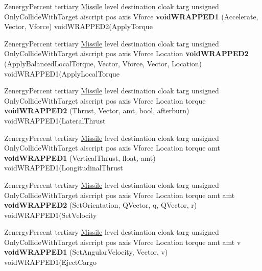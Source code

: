 \begin{DoxyCompactItemize}
\item 
Zenergy\+Percent tertiary \hyperlink{classMissile}{Missile} level destination cloak targ unsigned Only\+Collide\+With\+Target aiscript pos axis Vforce {\bfseries void\+W\+R\+A\+P\+P\+E\+D1} (Accelerate, Vector, Vforce) void\+W\+R\+A\+P\+P\+E\+D2(Apply\+Torque\hypertarget{classUnitWrapper_a747f10e478a4c68e806023e210dfbd9e}{}\label{classUnitWrapper_a747f10e478a4c68e806023e210dfbd9e}

\item 
Zenergy\+Percent tertiary \hyperlink{classMissile}{Missile} level destination cloak targ unsigned Only\+Collide\+With\+Target aiscript pos axis Vforce Location {\bfseries void\+W\+R\+A\+P\+P\+E\+D2} (Apply\+Balanced\+Local\+Torque, Vector, Vforce, Vector, Location) void\+W\+R\+A\+P\+P\+E\+D1(Apply\+Local\+Torque\hypertarget{classUnitWrapper_a66f83d8322c64e5e32cd712ec2e36564}{}\label{classUnitWrapper_a66f83d8322c64e5e32cd712ec2e36564}

\item 
Zenergy\+Percent tertiary \hyperlink{classMissile}{Missile} level destination cloak targ unsigned Only\+Collide\+With\+Target aiscript pos axis Vforce Location torque {\bfseries void\+W\+R\+A\+P\+P\+E\+D2} (Thrust, Vector, amt, bool, afterburn) void\+W\+R\+A\+P\+P\+E\+D1(Lateral\+Thrust\hypertarget{classUnitWrapper_a24edbdecf8bca27d250481aa52854764}{}\label{classUnitWrapper_a24edbdecf8bca27d250481aa52854764}

\item 
Zenergy\+Percent tertiary \hyperlink{classMissile}{Missile} level destination cloak targ unsigned Only\+Collide\+With\+Target aiscript pos axis Vforce Location torque amt {\bfseries void\+W\+R\+A\+P\+P\+E\+D1} (Vertical\+Thrust, float, amt) void\+W\+R\+A\+P\+P\+E\+D1(Longitudinal\+Thrust\hypertarget{classUnitWrapper_a58c887049cbddf2f1994d9a4bc4904cf}{}\label{classUnitWrapper_a58c887049cbddf2f1994d9a4bc4904cf}

\item 
Zenergy\+Percent tertiary \hyperlink{classMissile}{Missile} level destination cloak targ unsigned Only\+Collide\+With\+Target aiscript pos axis Vforce Location torque amt amt {\bfseries void\+W\+R\+A\+P\+P\+E\+D2} (Set\+Orientation, Q\+Vector, q, Q\+Vector, r) void\+W\+R\+A\+P\+P\+E\+D1(Set\+Velocity\hypertarget{classUnitWrapper_aad46beebd2aeef6ad298bf11dc4164a6}{}\label{classUnitWrapper_aad46beebd2aeef6ad298bf11dc4164a6}

\item 
Zenergy\+Percent tertiary \hyperlink{classMissile}{Missile} level destination cloak targ unsigned Only\+Collide\+With\+Target aiscript pos axis Vforce Location torque amt amt v {\bfseries void\+W\+R\+A\+P\+P\+E\+D1} (Set\+Angular\+Velocity, Vector, v) void\+W\+R\+A\+P\+P\+E\+D1(Eject\+Cargo\hypertarget{classUnitWrapper_ab37f630d21735f8e24f74f4bbc5098c5}{}\label{classUnitWrapper_ab37f630d21735f8e24f74f4bbc5098c5}


\end{DoxyCompactItemize}
